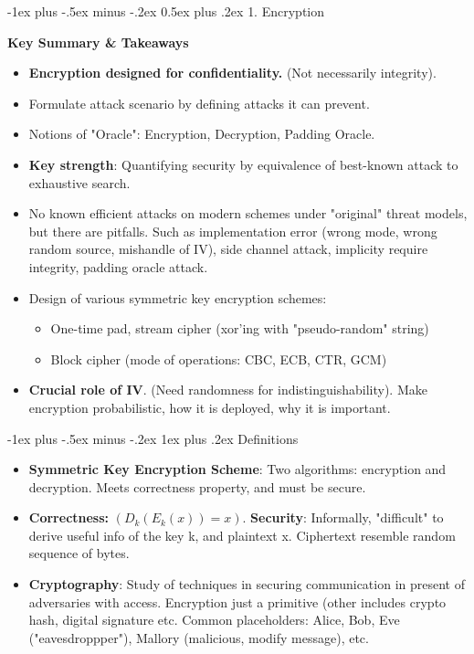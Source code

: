\documentclass[10pt, landscape]{article}
\makeatletter
\renewcommand{\section}{\@startsection{section}{1}{0mm}%
                                {-1ex plus -.5ex minus -.2ex}%
                                {0.5ex plus .2ex}%
                                {\normalfont\large\bfseries}}
\renewcommand{\subsubsection}{\@startsection{subsubsection}{3}{0mm}%
                                {-1ex plus -.5ex minus -.2ex}%
                                {1ex plus .2ex}%
                                {\normalfont\small\bfseries}}
\makeatother
\begin{document}
\begin{multicols*}{3}
\section{1. Encryption}

\textbf{Key Summary \& Takeaways}
\begin{itemize}
\item \textbf{Encryption designed for confidentiality.} (Not necessarily integrity).
\item Formulate attack scenario by defining attacks it can prevent. 
\item Notions of "Oracle": Encryption, Decryption, Padding Oracle.
\item \textbf{Key strength}: Quantifying security by equivalence of best-known attack to exhaustive search.
\item No known efficient attacks on modern schemes under "original" threat models, but there are pitfalls. Such as implementation error (wrong mode, wrong random source, mishandle of IV), side channel attack, implicity require integrity, padding oracle attack.
\item Design of various symmetric key encryption schemes:
	\begin{itemize}
	\item One-time pad, stream cipher (xor'ing with "pseudo-random" string)
	\item Block cipher (mode of operations: CBC, ECB, CTR, GCM)
	\end{itemize}
\item \textbf{Crucial role of IV}. (Need randomness for indistinguishability). Make encryption probabilistic, how it is deployed, why it is important.
\end{itemize}

\subsubsection{Definitions}
\begin{itemize}
\item \textbf{Symmetric Key Encryption Scheme}: Two algorithms: encryption and decryption. Meets correctness property, and must be secure.
\item \textbf{Correctness:} $(D_k (E_k (x) ) = x )$. \textbf{Security}: Informally, "difficult" to derive useful info of the key k, and plaintext x. Ciphertext resemble random sequence of bytes.
\item \textbf{Cryptography}: Study of techniques in securing communication in present of adversaries with access. Encryption just a primitive (other includes crypto hash, digital signature etc. Common placeholders: Alice, Bob, Eve ("eavesdroppper"), Mallory (malicious, modify message), etc.
\end{itemize}


\end{multicols*}
\end{document}
